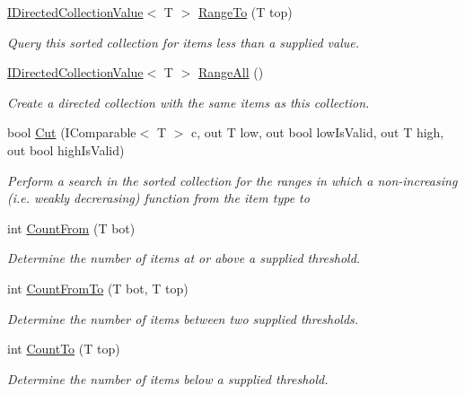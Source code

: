 \begin{DoxyCompactItemize}
\hyperlink{interface_c5_1_1_i_directed_collection_value}{I\+Directed\+Collection\+Value}$<$ T $>$ \hyperlink{class_c5_1_1_tree_set_a985e0d37430ea38bd4280e9a8550324d}{Range\+To} (T top)
\begin{DoxyCompactList}\small\item\em Query this sorted collection for items less than a supplied value. \end{DoxyCompactList}\item 
\hyperlink{interface_c5_1_1_i_directed_collection_value}{I\+Directed\+Collection\+Value}$<$ T $>$ \hyperlink{class_c5_1_1_tree_set_aba645a9d9b6a5f5787df7e4393d5f60e}{Range\+All} ()
\begin{DoxyCompactList}\small\item\em Create a directed collection with the same items as this collection. \end{DoxyCompactList}\item 
bool \hyperlink{class_c5_1_1_tree_set_a3676dcb09ca7c5a0100befd8925cbcdb}{Cut} (I\+Comparable$<$ T $>$ c, out T low, out bool low\+Is\+Valid, out T high, out bool high\+Is\+Valid)
\begin{DoxyCompactList}\small\item\em Perform a search in the sorted collection for the ranges in which a non-\/increasing (i.\+e. weakly decrerasing) function from the item type to \end{DoxyCompactList}\item 
int \hyperlink{class_c5_1_1_tree_set_a9572f2d67981336f00d0146aa8a28b33}{Count\+From} (T bot)
\begin{DoxyCompactList}\small\item\em Determine the number of items at or above a supplied threshold. \end{DoxyCompactList}\item 
int \hyperlink{class_c5_1_1_tree_set_a1e7a0e1964ad077bab826f4946c03838}{Count\+From\+To} (T bot, T top)
\begin{DoxyCompactList}\small\item\em Determine the number of items between two supplied thresholds. \end{DoxyCompactList}\item 
int \hyperlink{class_c5_1_1_tree_set_a9d4bd1c0f7e922a410501c3b258caac5}{Count\+To} (T top)
\begin{DoxyCompactList}\small\item\em Determine the number of items below a supplied threshold. \end{DoxyCompactList}\item 

\end{DoxyCompactItemize}
